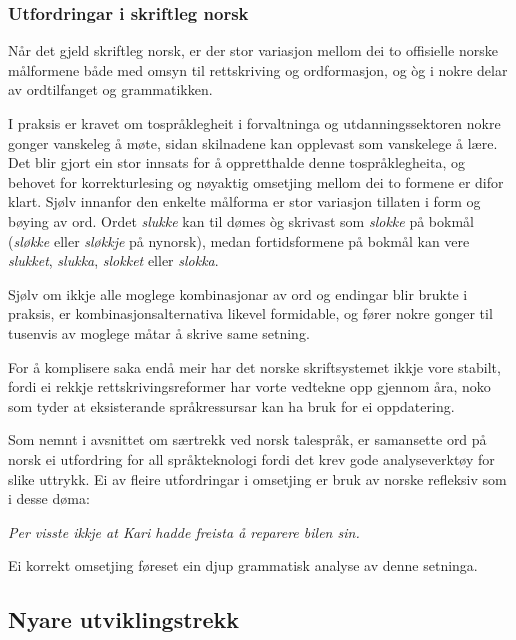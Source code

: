 \begin{multicols}{2}
\subsubsection{Utfordringar i skriftleg norsk}

Når det gjeld skriftleg norsk, er der stor variasjon mellom dei to offisielle norske målformene både med omsyn til rettskriving og ordformasjon, og òg i nokre delar av ordtilfanget og grammatikken. 

I praksis er kravet om tospråklegheit i forvaltninga og utdanningssektoren nokre gonger vanskeleg å møte, sidan skilnadene kan opplevast som vanskelege å lære. Det blir gjort ein stor innsats for å oppretthalde denne tospråklegheita, og behovet for korrekturlesing og nøyaktig omsetjing mellom dei to formene er difor klart. Sjølv innanfor den enkelte målforma er stor variasjon tillaten i form og bøying av ord. Ordet \textit{slukke} kan til dømes òg skrivast som \textit{slokke} på bokmål (\textit{sløkke} eller \textit{sløkkje} på nynorsk), medan fortidsformene på bokmål kan vere \textit{slukket}, \textit{slukka}, \textit{slokket} eller \textit{slokka}. 


Sjølv om ikkje alle moglege kombinasjonar av ord og endingar blir brukte i praksis, er kombinasjonsalternativa likevel formidable, og fører nokre gonger til tusenvis av moglege måtar å skrive same setning. 

For å komplisere saka endå meir har det norske skriftsystemet ikkje vore stabilt, fordi ei rekkje rettskrivingsreformer har vorte vedtekne opp gjennom åra, noko som tyder at eksisterande språkressursar kan ha bruk for ei oppdatering. 

Som nemnt i avsnittet om særtrekk ved norsk talespråk, er samansette ord på norsk ei utfordring for all språkteknologi fordi det krev gode analyseverktøy for slike uttrykk.
Ei av fleire utfordringar i omsetjing er bruk av norske refleksiv som i desse døma:

\smallskip
\emph{Per visste ikkje at Kari hadde freista å reparere bilen \emph{sin}.}

\smallskip
Ei korrekt omsetjing føreset ein djup grammatisk analyse av denne setninga. 

\subsection{Nyare utviklingstrekk}


\end{multicols}
